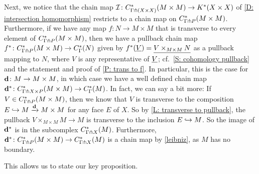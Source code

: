 Next, we notice that the chain map $\mathcal{I} \colon C^*_{\Gamma \pitchfork (X\times X)}(M\times M) \to K^*(X \times X)$ of \cref{D: intersection homomorphism} restricts to a chain map on $C^*_{\Gamma \pitchfork P}(M\times M)$.
Furthermore, if we have any map $f \colon N \to M \times M$ that is transverse to every element of $C^*_{\Gamma \pitchfork P}(M\times M)$, then we have a pullback chain map $f^* \colon C^*_{\Gamma \pitchfork P}(M\times M) \to C^*_\Gamma(N)$ given by $f^*(\underline{V}) = \underline{V \times_{M \times M} N}$ as a pullback mapping to $N$, where $V$ is any representative of $\underline{V}$; cf.\ \cref{S: cohomology pullback} and the statement and proof of \cref{P: trans to f}.
In particular, this is the case for $\mathbf{d} \colon M \to M \times M$, in which case we have a well defined chain map $\mathbf{d}^* \colon C^*_{\Gamma \pitchfork X\times P}(M\times M) \to C^*_\Gamma(M)$.
In fact, we can say a bit more: If $V \in  C^*_{\Gamma \pitchfork P}(M\times M)$, then we know that $V$ is transverse to the composition $E \hookrightarrow M \xrightarrow{\mathbf{d}} M \times M$ for any face $E$ of $X$.
So by \cref{L: transverse to pullback}, the pullback $V \times_{M \times M} M \to M$ is transverse to the inclusion $E \hookrightarrow M$.
So the image of $\mathbf{d}^*$ is in the subcomplex $C^*_{\Gamma \pitchfork X}(M)$.
Furthermore, $\mathbf{d}^* \colon C^*_{\Gamma \pitchfork P}(M \times M) \to C^*_{\Gamma \pitchfork X}(M)$ is a chain map by \cref{leibniz}, as $M$ has no boundary.

This allows us to state our key proposition.

